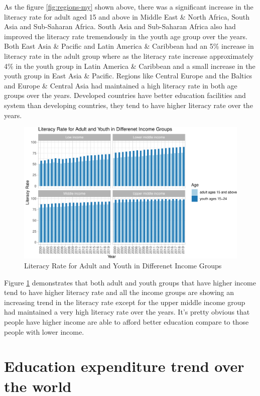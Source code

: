 \documentclass[11pt,a4paper,]{article}
\begin{document}
As the figure \ref{fig:regions-my} shown above, there was a significant increase in the literacy rate for adult aged 15 and above in Middle East \& North Africa, South Asia and Sub-Saharan Africa. South Asia and Sub-Saharan Africa also had improved the literacy rate tremendously in the youth age group over the years. Both East Asia \& Pacific and Latin America \& Caribbean had an 5\% increase in literacy rate in the adult group where as the literacy rate increase approximately 4\% in the youth group in Latin America \& Caribbean and a small increase in the youth group in East Asia \& Pacific. Regions like Central Europe and the Baltics and Europe \& Central Asia had maintained a high literacy rate in both age groups over the years. Developed countries have better education facilities and system than developing countries, they tend to have higher literacy rate over the years.

\begin{figure}[H]
\includegraphics[width=0.9\linewidth,]{report_files/figure-latex/income-my-1} \caption{Literacy Rate for Adult and Youth in Differenet Income Groups}\label{fig:income-my}
\end{figure}

Figure \ref{fig:income-my} demonstrates that both adult and youth groups that have higher income tend to have higher literacy rate and all the income groups are showing an increasing trend in the literacy rate except for the upper middle income group had maintained a very high literacy rate over the years. It's pretty obvious that people have higher income are able to afford better education compare to those people with lower income.

\section*{Education expenditure trend over the world}
\end{document}
